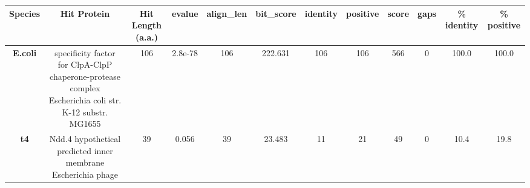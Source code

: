 \begin{tabular}{|c|c|c|c|c|c|c|c|c|c|c|c|} \hline
\textbf{Species} & \textbf{Hit Protein} & \textbf{Hit Length (a.a.)} & \textbf{evalue} & \textbf{align\_len} & \textbf{bit\_score} & \textbf{identity} & \textbf{positive} & \textbf{score} & \textbf{gaps} & \textbf{\% identity} & \textbf{\% positive} \\ \hline
\textbf{E.coli} & specificity factor for ClpA-ClpP chaperone-protease complex Escherichia coli str. K-12 substr. MG1655 & 106 & 2.8e-78 & 106 & 222.631 & 106 & 106 & 566 & 0 & 100.0 & 100.0\\
\textbf{t4} & Ndd.4 hypothetical predicted inner membrane Escherichia phage  & 39 & 0.056 & 39 & 23.483 & 11 & 21 & 49 & 0 & 10.4 & 19.8\\
\hline \end{tabular}
